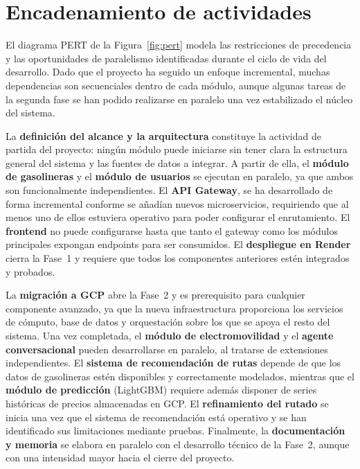 \section{Encadenamiento de actividades}
El diagrama PERT de la Figura~\ref{fig:pert} modela las restricciones de precedencia y las oportunidades de paralelismo identificadas durante el ciclo de vida del desarrollo. 
Dado que el proyecto ha seguido un enfoque incremental, muchas dependencias son secuenciales dentro de cada
módulo, aunque algunas tareas de la segunda fase se han podido realizarse en paralelo una vez
estabilizado el núcleo del sistema.

La \textbf{definición del alcance y la arquitectura} constituye la actividad de partida del
proyecto: ningún módulo puede iniciarse sin tener clara la estructura general del sistema y las
fuentes de datos a integrar. A partir de ella, el \textbf{módulo de gasolineras} y el
\textbf{módulo de usuarios} se ejecutan en paralelo, ya que ambos son funcionalmente
independientes. El
\textbf{API Gateway}, se ha desarrollado de forma incremental conforme se añadían
nuevos microservicios, requiriendo que al menos uno de ellos estuviera operativo para poder
configurar el enrutamiento. El \textbf{frontend} no puede configurarse hasta que tanto el
gateway como los módulos principales expongan endpoints para ser consumidos. El
\textbf{despliegue en Render} cierra la Fase~1 y requiere que todos los componentes anteriores
estén integrados y probados.

La \textbf{migración a GCP} abre la Fase~2 y es prerequisito para cualquier componente
avanzado, ya que la nueva infraestructura proporciona los servicios de cómputo, base de datos
y orquestación sobre los que se apoya el resto del sistema. Una vez completada, el
\textbf{módulo de electromovilidad} y el \textbf{agente conversacional} pueden desarrollarse
en paralelo, al tratarse de extensiones independientes. El \textbf{sistema de recomendación
  de rutas} depende de que los datos de gasolineras estén disponibles y
correctamente modelados, mientras que el \textbf{módulo de predicción} (LightGBM) requiere
además disponer de series históricas de precios almacenadas en GCP. El
\textbf{refinamiento del rutado} se inicia una vez que el sistema de recomendación está
operativo y se han identificado sus limitaciones mediante pruebas. Finalmente, la
\textbf{documentación y memoria} se elabora en paralelo con el desarrollo técnico de la
Fase~2, aunque con una intensidad mayor hacia el cierre del proyecto.
 
